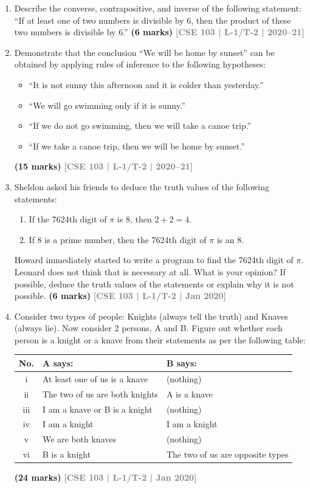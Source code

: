 \documentclass[12pt,a3paper]{article}
\newcommand{\yr}[1]{\hfill\textcolor{gray}{\small\textbf{[#1]}}}
\newcommand{\mk}[1]{\textcolor{orange!70!black}{\small\textbf{(#1 marks)}}}
\begin{document}
\begin{enumerate}
\item Describe the converse, contrapositive, and inverse of the following statement: ``If at least one of two numbers is divisible by 6, then the product of these two numbers is divisible by 6.''
\mk{6} \yr{CSE 103 | L-1/T-2 | 2020--21}

\item Demonstrate that the conclusion ``We will be home by sunset'' can be obtained by applying rules of inference to the following hypotheses:
\begin{itemize}[leftmargin=1.8em,itemsep=2pt,label={$\bullet$}]
  \item ``It is not sunny this afternoon and it is colder than yesterday.''
  \item ``We will go swimming only if it is sunny.''
  \item ``If we do not go swimming, then we will take a canoe trip.''
  \item ``If we take a canoe trip, then we will be home by sunset.''
\end{itemize}
\mk{15} \yr{CSE 103 | L-1/T-2 | 2020--21}

\item Sheldon asked his friends to deduce the truth values of the following statements:
\begin{enumerate}
  \item If the 7624th digit of $\pi$ is 8, then $2 + 2 = 4$.
  \item If 8 is a prime number, then the 7624th digit of $\pi$ is an 8.
\end{enumerate}
Howard immediately started to write a program to find the 7624th digit of $\pi$. Leonard does not think that is necessary at all. What is your opinion? If possible, deduce the truth values of the statements or explain why it is not possible.
\mk{6} \yr{CSE 103 | L-1/T-2 | Jan 2020}

\item Consider two types of people: Knights (always tell the truth) and Knaves (always lie). Now consider 2 persons, A and B. Figure out whether each person is a knight or a knave from their statements as per the following table:
\begin{center}
\begin{tabular}{c|l|l}
\toprule
\textbf{No.} & \textbf{A says:} & \textbf{B says:} \\\midrule
i   & At least one of us is a knave & (nothing) \\
ii  & The two of us are both knights & A is a knave \\
iii & I am a knave or B is a knight & (nothing) \\
iv  & I am a knight & I am a knight \\
v   & We are both knaves & (nothing) \\
vi  & B is a knight & The two of us are opposite types \\\bottomrule
\end{tabular}
\end{center}
\mk{24} \yr{CSE 103 | L-1/T-2 | Jan 2020}



\end{enumerate}
\end{document}
